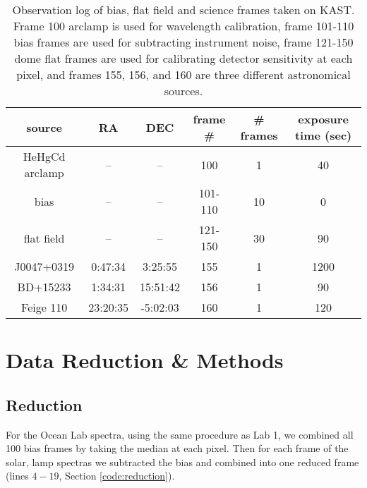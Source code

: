 \documentclass[preprint]{aastex62}
\begin{document}
\begin{table}[H]
    \begin{center}
    \begin{tabular}{|c|c|c|c|c|c|}
    \hline
    source     & RA       & DEC      & frame \# & \# frames & exposure time (sec) \\
    \hline \hline
    HeHgCd arclamp &     --   &    --    & 100      & 1         & 40                  \\
    bias       &    --    &     --   & 101-110  & 10        & 0                   \\
    flat field &    --    &     --   & 121-150  & 30        & 90                  \\
    J0047+0319 & 0:47:34  & 3:25:55  & 155      & 1         & 1200                \\
    BD+15233   & 1:34:31  & 15:51:42 & 156      & 1         & 90                  \\
    Feige 110  & 23:20:35 & -5:02:03 & 160      & 1         & 120                 \\
    \hline     
    \end{tabular}
    \end{center}
\caption{Observation log of bias, flat field and science frames taken on KAST. Frame 100 arclamp is used for wavelength calibration, frame 101-110 bias frames are used for subtracting instrument noise, frame 121-150 dome flat frames are used for calibrating detector sensitivity at each pixel, and frames 155, 156, and 160 are three different astronomical sources.} \label{table:log}
\end{table}

\section{Data Reduction \& Methods} \label{sec:methods}
\subsection{Reduction}
For the Ocean Lab spectra, using the same procedure as Lab 1, we combined all 100 bias frames by taking the median at each pixel. Then for each frame of the solar, lamp spectras we subtracted the bias and combined into one reduced frame (lines $4-19$, Section \ref{code:reduction}).
\end{document}
